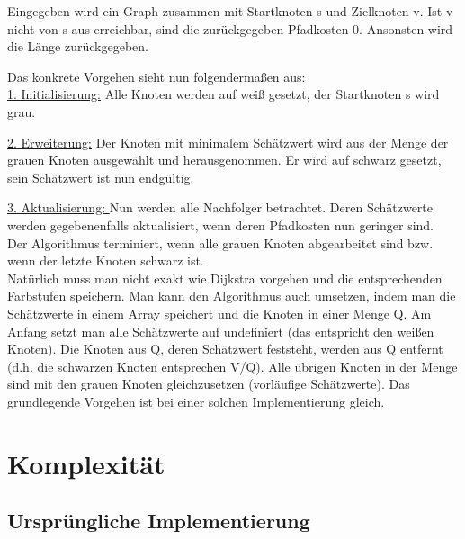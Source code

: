 \parindent0pt Eingegeben wird ein Graph zusammen mit Startknoten s und Zielknoten v. Ist v nicht von s aus erreichbar, sind die zurückgegeben Pfadkosten 0. Ansonsten wird die Länge zurückgegeben.

\parindent0pt Das konkrete Vorgehen sieht nun folgendermaßen aus: \\

\parindent0pt \underline{1. Initialisierung:} Alle Knoten werden auf weiß gesetzt, der Startknoten s wird grau.

\parindent0pt \underline{2. Erweiterung:} Der Knoten mit minimalem Schätzwert wird aus der Menge der grauen Knoten ausgewählt und herausgenommen. Er wird auf schwarz gesetzt, sein Schätzwert ist nun endgültig.

\parindent0pt \underline{3. Aktualisierung: }Nun werden alle Nachfolger betrachtet. Deren Schätzwerte werden gegebenenfalls aktualisiert, wenn deren Pfadkosten nun geringer sind. \\ 

\parindent0pt Der Algorithmus terminiert, wenn alle grauen Knoten abgearbeitet sind bzw. wenn der letzte Knoten schwarz ist. \\

Natürlich muss man nicht exakt wie Dijkstra vorgehen und die entsprechenden Farbstufen speichern. Man kann den Algorithmus auch umsetzen, indem man die Schätzwerte in einem Array speichert und die Knoten in einer Menge Q. Am Anfang setzt man alle Schätzwerte auf undefiniert (das entspricht den weißen Knoten). Die Knoten aus Q, deren Schätzwert feststeht, werden aus Q entfernt (d.h. die schwarzen Knoten entsprechen V/Q). Alle übrigen Knoten in der Menge sind mit den grauen Knoten gleichzusetzen (vorläufige Schätzwerte). Das grundlegende Vorgehen ist bei einer solchen Implementierung gleich. 



\section{Komplexität}

\subsection{Ursprüngliche Implementierung}

